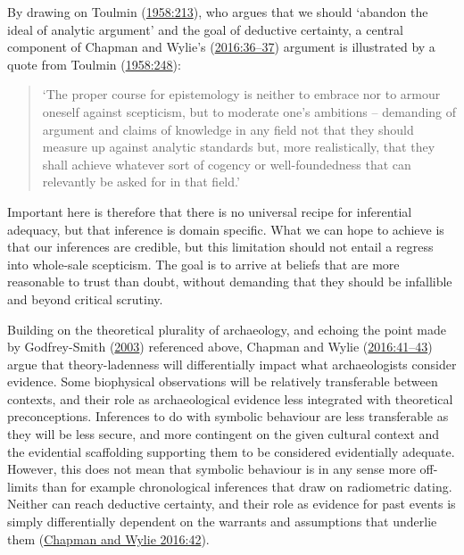 \documentclass[
  12pt,
  a4paper,
  oneside]{book}
\begin{document}
By drawing on Toulmin (\protect\hyperlink{ref-toulmin1958}{1958:213}), who argues that we should `abandon the ideal of analytic argument' and the goal of deductive certainty, a central component of Chapman and Wylie's (\protect\hyperlink{ref-chapman2016}{2016:36--37}) argument is illustrated by a quote from Toulmin (\protect\hyperlink{ref-toulmin1958}{1958:248}):

\begin{quote}
`The proper course for epistemology is neither to embrace nor to armour oneself against scepticism, but to moderate one's ambitions -- demanding of argument and claims of knowledge in any field not that they should measure up against analytic standards but, more realistically, that they shall achieve whatever sort of cogency or well-foundedness that can relevantly be asked for in that field.'
\end{quote}

Important here is therefore that there is no universal recipe for inferential adequacy, but that inference is domain specific. What we can hope to achieve is that our inferences are credible, but this limitation should not entail a regress into whole-sale scepticism. The goal is to arrive at beliefs that are more reasonable to trust than doubt, without demanding that they should be infallible and beyond critical scrutiny.

Building on the theoretical plurality of archaeology, and echoing the point made by Godfrey-Smith (\protect\hyperlink{ref-godfrey-smith2003}{2003}) referenced above, Chapman and Wylie (\protect\hyperlink{ref-chapman2016}{2016:41--43}) argue that theory-ladenness will differentially impact what archaeologists consider evidence. Some biophysical observations will be relatively transferable between contexts, and their role as archaeological evidence less integrated with theoretical preconceptions. Inferences to do with symbolic behaviour are less transferable as they will be less secure, and more contingent on the given cultural context and the evidential scaffolding supporting them to be considered evidentially adequate. However, this does not mean that symbolic behaviour is in any sense more off-limits than for example chronological inferences that draw on radiometric dating. Neither can reach deductive certainty, and their role as evidence for past events is simply differentially dependent on the warrants and assumptions that underlie them (\protect\hyperlink{ref-chapman2016}{Chapman and Wylie 2016:42}).
\end{document}
